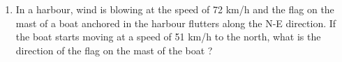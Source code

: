 \renewcommand{\theequation}{\theenumi}
\begin{enumerate}[label=\arabic*.,ref=\thesubsection.\theenumi]

\item In a harbour, wind is blowing at the speed of
72 km/h and the flag on the mast of a boat
anchored in the harbour flutters along the N-E
direction. If the boat starts moving at a speed
of 51 km/h to the north, what is the direction
of the flag on the mast of the boat ?
\end{enumerate}